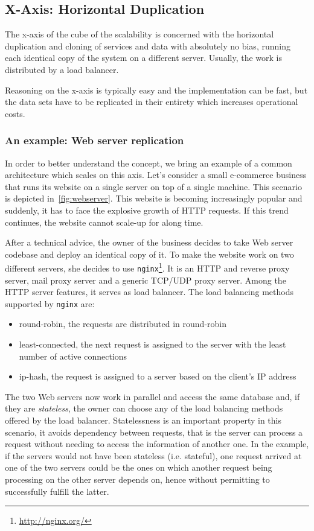 \subsection{X-Axis: Horizontal Duplication}
\label{sec:x-axis}

The x-axis of the cube of the scalability is concerned with the horizontal
duplication and cloning of services and data with absolutely no bias, running
each identical copy of the system on a different server. Usually, the work is
distributed by a load balancer.

Reasoning on the x-axis is typically easy and the implementation can be fast,
but the data sets have to be replicated in their entirety which increases
operational costs.

\subsubsection{An example: Web server replication}
In order to better understand the concept, we bring an example of a common
architecture which scales on this axis. Let's consider a small e-commerce
business that runs its website on a single server on top of a single machine.
This scenario is depicted in~\autoref{fig:webserver}. This website is becoming increasingly popular and suddenly, it has to face the explosive growth of HTTP requests. If this trend continues, the website cannot scale-up for along time.

After a technical advice, the owner of the business decides to take Web server 
codebase and deploy an identical copy of it. To make the website work on two
different servers, she decides to use
\texttt{nginx}\footnote{\url{http://nginx.org/}}. It is an HTTP and reverse
proxy server, mail proxy server and a generic TCP/UDP proxy server. Among the
HTTP server features, it serves as load balancer. The load balancing methods
supported by \texttt{nginx} are:

\begin{itemize}
  \item round-robin, the requests are distributed in round-robin
  \item least-connected, the next request is assigned to the server with the
  least number of active connections
  \item ip-hash, the request is assigned to a server based on the client's IP
  address
\end{itemize}

The two Web servers now work in parallel and access the same database and,
if they are \emph{stateless}, the owner can choose any of the load 
balancing methods offered by the load balancer. Statelessness is an important
property in this scenario, it avoids dependency between requests, that is the
server can process a request without needing to access the information of
another one. In the example, if the servers would not have been stateless (i.e.
stateful), one request arrived at one of the two servers could be the ones
on which another request being processing on the other server depends on, hence
without permitting to successfully fulfill the latter.



